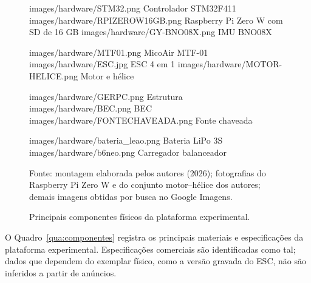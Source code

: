\begin{figure}[H]
    \centering
    \caption{Principais componentes físicos da plataforma experimental.}
    \label{fig:componentes_principais}

    \noindent
    \componente
        {images/hardware/STM32.png}
        {Controlador STM32F411}
    \hfill
    \componente
        {images/hardware/RPIZEROW16GB.png}
        {Raspberry Pi Zero W com SD de 16 GB}
    \hfill
    \componente
        {images/hardware/GY-BNO08X.png}
        {IMU BNO08X}

    \par\vspace{0.35cm}

    \noindent
    \componente
        {images/hardware/MTF01.png}
        {MicoAir MTF-01}
    \hfill
    \componente
        {images/hardware/ESC.jpg}
        {ESC 4 em 1}
    \hfill
    \componente
        {images/hardware/MOTOR-HELICE.png}
        {Motor e hélice}

    \par\vspace{0.35cm}

    \noindent
    \componente
        {images/hardware/GERPC.png}
        {Estrutura}
    \hfill
    \componente
        {images/hardware/BEC.png}
        {BEC}
    \hfill
    \componente
        {images/hardware/FONTECHAVEADA.png}
        {Fonte chaveada}

    \par\vspace{0.35cm}

    \noindent
    \hfill
    \componente
        {images/hardware/bateria_leao.png}
        {Bateria LiPo 3S}
    \hfill
    \componente
        {images/hardware/b6neo.png}
        {Carregador balanceador}
    \hfill\null

    \par\vspace{0.25cm}
    \begin{minipage}{0.95\textwidth}
        \centering
        \footnotesize Fonte: montagem elaborada pelos autores (2026); fotografias do Raspberry Pi Zero W e do conjunto motor--hélice dos autores; demais imagens obtidas por busca no Google Imagens.
    \end{minipage}
\end{figure}

O Quadro~\ref{qua:componentes} registra os principais materiais e especificações da plataforma experimental. Especificações comerciais são identificadas como tal; dados que dependem do exemplar físico, como a versão gravada do ESC, não são inferidos a partir de anúncios.

